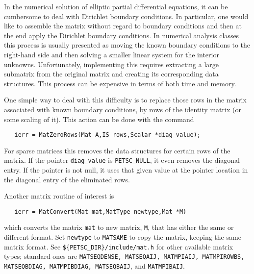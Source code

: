 In the numerical solution of elliptic partial differential equations,
it can be cumbersome to deal with Dirichlet boundary 
 conditions. In
particular, one would like to assemble the matrix without regard to 
boundary conditions and then at the end apply the Dirichlet boundary 
conditions. 
In numerical analysis classes this process is usually presented as moving the 
known boundary conditions to the right-hand side and then solving a smaller
linear system for the interior unknowns. Unfortunately, implementing this
requires extracting a large submatrix from the original matrix and 
creating its corresponding data structures. This process can be expensive 
in terms of both time and memory. 

One simple way to deal with this difficulty is to replace those rows in the 
matrix associated with known boundary conditions, by rows of the 
identity matrix (or some scaling of it). This action can be done with 
the command 
\begin{verbatim}
   ierr = MatZeroRows(Mat A,IS rows,Scalar *diag_value);
\end{verbatim}
For sparse matrices this removes the data structures for certain rows 
of the matrix. If the pointer {\tt diag\_value} is {\tt PETSC\_NULL}, it 
even removes the diagonal entry. If the pointer is not null, it uses that 
given value at the pointer location 
in the diagonal entry of the eliminated rows. 


Another matrix routine of interest is 
\begin{verbatim}
   ierr = MatConvert(Mat mat,MatType newtype,Mat *M)
\end{verbatim}
which converts the matrix {\tt mat} to new matrix, {\tt M}, that has
either the same or different format.  Set {\tt newtype} to {\tt MATSAME}
to copy the matrix, keeping the same matrix format.  See 
{\tt \$\{PETSC\_DIR\}/include/mat.h} for other available matrix types;
standard ones are {\tt MATSEQDENSE, MATSEQAIJ,   MATMPIAIJ,  
               MATMPIROWBS, MATSEQBDIAG, MATMPIBDIAG,  MATSEQBAIJ}, and
               {\tt MATMPIBAIJ}.

